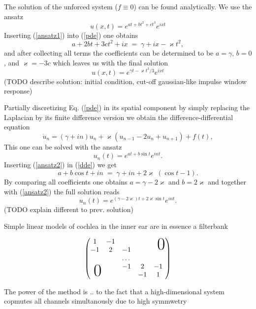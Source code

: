 \documentclass[journal]{IEEEtran}
\newcommand	{\be}	{\begin{equation}}
\newcommand	{\ee}	{\end{equation}}
\begin{document}
The solution of the unforced system ($f \equiv 0$) can be found analytically. We use the ansatz
\be \label{ansatz1}
	u(x,t) = e^{at + bt^2 + ct^3} e^{ixt}
\ee
Inserting (\ref{ansatz1}) into (\ref{pde}) one obtains
$$
	a  +  2 b t  +  3 c t^2  +  ix \; = \; \gamma + i x - \varkappa t^2,
$$
and after collecting all terms the coefficients can be determined to be $a=\gamma$, $b=0$, and $\varkappa = -3c$
which leaves us with the final solution
\be \label{pde-solution}
	u(x,t) = e^{\gamma t - \varkappa t^3/3} e^{ixt}
\ee
(TODO describe solution: initial condition, cut-off gaussian-like impulse window response)



Partially discretizing Eq. (\ref{pde}) in its spatial component by simply replacing the Laplacian by its finite
difference version we obtain the difference-differential equation
\be \label{dde}
	\dot{u}_n = (\gamma + i n) u_n  +  \varkappa ( u_{n-1} - 2 u_n + u_{n+1} )  +  f(t),
\ee
This one can be solved with the ansatz
\be \label{ansatz2}
	u_n(t) = e^{a t  +  b \sin t} e^{int}.
\ee
Inserting (\ref{ansatz2}) in (\ref{dde}) we get
$$
     a + b \cos t + i n \; = \; \gamma + i n + 2\varkappa\; ( \cos t - 1 ).
$$
By comparing all coefficients one obtains $a = \gamma - 2 \varkappa$ and $b = 2\varkappa$ and together with
(\ref{ansatz2}) the full solution reads
\be
	u_n(t) = e^{(\gamma - 2 \varkappa) t  +  2\varkappa \sin t} e^{int}.
\ee
(TODO explain different to prev. solution)




Simple linear models of cochlea in the inner ear are in essence a filterbank 

\be \label{eq:discrete_laplacian}
\begin{pmatrix}
      1  & -1 & & & \multicolumn{2}{c}{\text{\kern0.5em\smash{\raisebox{-2ex}{\Huge 0}}}} \\
      -1 &  2 & -1 \\
         & & \dots & & \\
	     & & -1 &  2 & -1 \\
      \multicolumn{2}{c}{\text{\kern-1.5em\smash{\raisebox{0.25ex}{\Huge 0}}}} & & -1 & 1
    \end{pmatrix}
\ee


The power of the method is .. to the fact that a high-dimensional system copmutes all channels
simultanously due to high symmwetry



\end{document}
